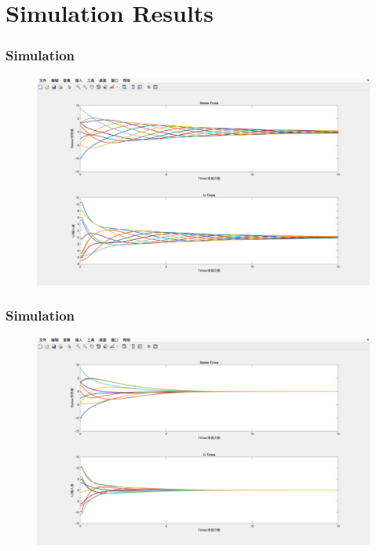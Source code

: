 \documentclass{beamer}
\begin{document}
\section{Simulation Results}

\begin{frame}
\frametitle{Simulation}
\begin{figure}[htbp]
    \includegraphics[width=12cm]{figures/Result1-Fig5a.png}
\end{figure}

\end{frame}
\begin{frame}
\frametitle{Simulation}
\begin{figure}[htbp]
    \includegraphics[width=12cm]{figures/Result2-Fig5b.png}
\end{figure}

\end{frame}
\end{document}
